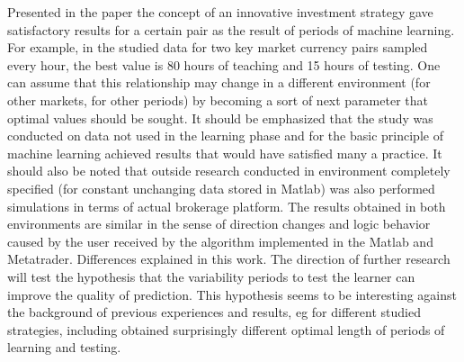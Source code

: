 \documentclass[runningheads,a4paper]{llncs}
\begin{document}
Presented in the paper the concept of an innovative investment strategy gave satisfactory results for a certain pair as the result of periods of machine learning. For example, in the studied data for two key market currency pairs sampled every hour, the best value is 80 hours of teaching and 15 hours of testing. One can assume that this relationship may change in a different environment (for other markets, for other periods) by becoming a sort of next parameter that optimal values should be sought. It should be emphasized that the study was conducted on data not used in the learning phase and for the basic principle of machine learning achieved results that would have satisfied many a practice. It should also be noted that outside research conducted in environment completely specified (for constant unchanging data stored in Matlab) was also performed simulations in terms of actual brokerage platform. The results obtained in both environments are similar in the sense of direction changes and logic behavior caused by the user received by the algorithm implemented in the Matlab and Metatrader. Differences explained in this work.
The direction of further research will test the hypothesis that the variability periods to test the learner can improve the quality of prediction. This hypothesis seems to be interesting against the background of previous experiences and results, eg for different studied strategies, including \cite{Wilinski2014} obtained surprisingly different optimal length of periods of learning and testing.
\cite{krutsinger}\cite{lewis}\cite{murphy}\cite{provost}\cite{wang}\cite{sinclare}\cite{person}\cite{tian}





\end{document}
